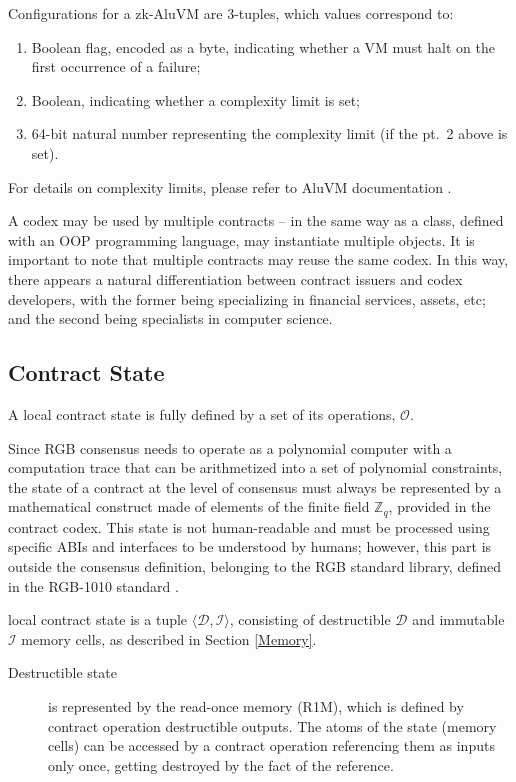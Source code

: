 \documentclass[9pt,oneside]{amsart}
\begin{document}
\begin{multicols}{2}


Configurations for a zk-AluVM are 3-tuples, which values correspond to:
\noindent
\begin{enumerate}
\item Boolean flag, encoded as a byte,
    indicating whether a VM must halt on the first occurrence of a failure;
\item Boolean, indicating whether a complexity limit is set;
\item 64-bit natural number representing the complexity limit (if the pt.~2 above is set).
\end{enumerate}

For details on complexity limits, please refer to AluVM documentation \cite{AluVM}.

A codex may be used by multiple contracts – in the same way as a class,
defined with an OOP programming language, may instantiate multiple objects.
It is important to note that multiple contracts may reuse the same codex.
In this way, there appears a natural differentiation between contract issuers and codex developers,
with the former being specializing in financial services, assets, etc;
and the second being specialists in computer science.


\subsection{Contract State}

A \gls{local contract state} is fully defined by a set of its operations, $\mathcal{O}$.

Since RGB consensus needs to operate as a polynomial computer
with a computation trace that can be arithmetized into a set of polynomial constraints,
the state of a contract at the level of consensus must always be represented
by a mathematical construct made of elements of the finite field $\mathbb{Z}_q$,
provided in the contract codex.
This state is not human-readable and must be processed using specific ABIs and interfaces
to be understood by humans; however, this part is outside the consensus definition,
belonging to the RGB standard library, defined in the RGB-1010 standard \cite{RGB1010}.

\Gls{local contract state} is a tuple $\langle \mathcal{D}, \mathcal{I} \rangle$,
consisting of destructible $\mathcal{D}$ and immutable $\mathcal{I}$ memory cells,
as described in Section \ref{Memory}.

\begin{description}
\item[Destructible state] is represented by the \gls{read-once memory} (R1M),
  which is defined by contract operation destructible outputs.
  The atoms of the state (memory cells) can be accessed by a contract operation
  referencing them as inputs only once, getting destroyed by the fact of the reference.


\end{description}
\end{multicols}
\end{document}
